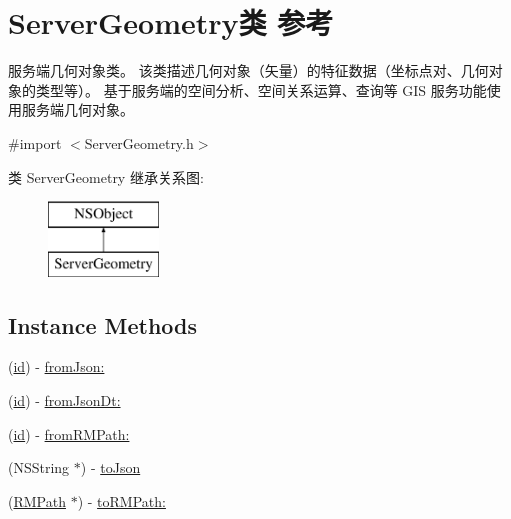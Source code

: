 \hypertarget{interface_server_geometry}{\section{Server\-Geometry类 参考}
\label{interface_server_geometry}
}


服务端几何对象类。 该类描述几何对象（矢量）的特征数据（坐标点对、几何对象的类型等）。 基于服务端的空间分析、空间关系运算、查询等 G\-I\-S 服务功能使用服务端几何对象。  




{\ttfamily \#import $<$Server\-Geometry.\-h$>$}

类 Server\-Geometry 继承关系图\-:\begin{figure}[H]
\begin{center}
\leavevmode
\includegraphics[height=2.000000cm]{interface_server_geometry}
\end{center}
\end{figure}
\subsection*{Instance Methods}
\begin{DoxyCompactItemize}
\item 
(\hyperlink{interface_server_geometry_aeaf1259147fdbd921ffd3fbb2cad2042}{id}) -\/ \hyperlink{interface_server_geometry_a211a04abb0de69457af764fcd92f8a83}{from\-Json\-:}
\item 
(\hyperlink{interface_server_geometry_aeaf1259147fdbd921ffd3fbb2cad2042}{id}) -\/ \hyperlink{interface_server_geometry_a3cda98911709c06629b258398a22fd1f}{from\-Json\-Dt\-:}
\item 
(\hyperlink{interface_server_geometry_aeaf1259147fdbd921ffd3fbb2cad2042}{id}) -\/ \hyperlink{interface_server_geometry_ad07f35537623575135fe5201925b953d}{from\-R\-M\-Path\-:}
\item 
(N\-S\-String $\ast$) -\/ \hyperlink{interface_server_geometry_ac2c1956ae4ed734e2b0d65bce2fb9b83}{to\-Json}
\item 
(\hyperlink{interface_r_m_path}{R\-M\-Path} $\ast$) -\/ \hyperlink{interface_server_geometry_a743315afa049eb8e17b59a246dcbb61b}{to\-R\-M\-Path\-:}
\end{DoxyCompactItemize}
